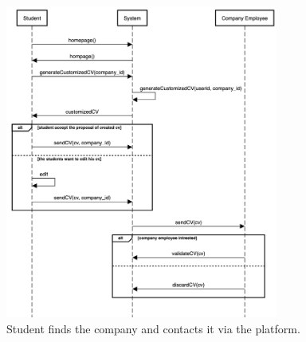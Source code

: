     \begin{figure}[H]
        \centering
        \includegraphics[width=0.8\textwidth]{RASD/Assets/SequenceDiagrams/3-student-contact-company.png}
        \caption{Student finds the company and contacts it via the platform.}
        \label{fig:Student search and contact the company}
    \end{figure}
    

